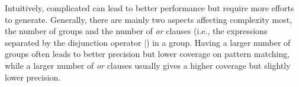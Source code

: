 
Intuitively, complicated \REs can lead to better performance but require more efforts to generate. %
 Generally, there are mainly two aspects affecting \RE complexity most, the number of \RE groups
and the number of \emph{or} clauses (i.e., the expressions separated by the disjunction operator $|$) in a \RE group. Having a larger
number of \RE groups often leads to better precision but lower coverage on pattern matching, while a larger number of \emph{or} clauses
usually gives a higher coverage but slightly lower precision.



